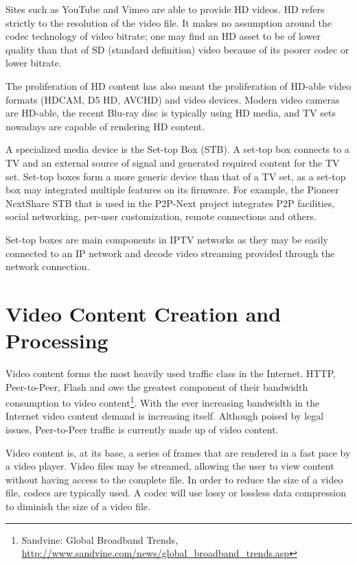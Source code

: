 Sites such as YouTube and Vimeo are able to provide HD videos. HD refers
strictly to the resolution of the video file. It makes no assumption around
the codec technology of video bitrate; one may find an HD asset to be of lower
quality than that of SD (standard definition) video because of its poorer
codec or lower bitrate.

The proliferation of HD content has also meant the proliferation of HD-able
video formats (HDCAM, D5 HD, AVCHD) and video devices. Modern video cameras
are HD-able, the recent Blu-ray disc is typically using HD media, and TV sets
nowadays are capable of rendering HD content.

A specialized media device is the Set-top Box (STB). A set-top box connects to
a TV and an external source of signal and generated required content for the
TV set. Set-top boxes form a more generic device than that of a TV set, as a
set-top box may integrated multiple features on its firmware. For example, the
Pioneer NextShare STB that is used in the P2P-Next project integrates P2P
facilities, social networking, per-user customization, remote connections and
others.


Set-top boxes are main components in IPTV networks as they may be easily
connected to an IP network and decode video streaming provided through the
network connection.

\section{Video Content Creation and Processing}
\label{sec:multimedia-dist:video}

Video content forms the most heavily used traffic class in the Internet. HTTP,
Peer-to-Peer, Flash and owe the greatest component of their bandwidth
consumption to video content\footnote{Sandvine: Global Broadband Trends,
\url{http://www.sandvine.com/news/global\_broadband\_trends.asp}}. With the ever
increasing bandwidth in the Internet video content demand is increasing
itself. Although poised by legal issues, Peer-to-Peer traffic is currently
made up of video content.

Video content is, at its base, a series of frames that are rendered in a fast
pace by a video player. Video files may be streamed, allowing the user to view
content without having access to the complete file. In order to reduce the
size of a video file, codecs are typically used. A codec will use lossy or
lossless data compression to diminish the size of a video file.

